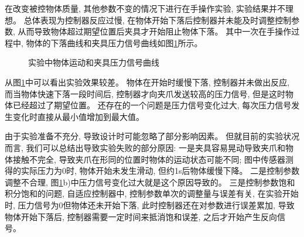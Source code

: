 在改变被控物体质量, 其他参数不变的情况下进行在手操作实验, 实验结果并不理想。
总体表现为控制器反应过慢, 在物体开始下落后控制器并未能及时调整控制参数,
从而导致物体超过期望位置后夹具才开始阻止物体下落。
其中一次在手操作过程中, 物体的下落曲线和夹具压力信号曲线如图\ref{fig:fh}所示。

\begin{figure}[!h]
  \centering
    \hspace{0pt}
  \caption{实验中物体运动和夹具压力信号曲线}
  \label{fig:fh}
  \vspace{-0.3cm}
\end{figure}

从图\ref{fig:fh}中可以看出实验效果较差。
物体在开始时缓慢下落, 控制器并未做出反应, 而当物体快速下落一段时间后, 
控制器才向夹爪发送较高的压力信号, 但是这时物体已经超过了期望位置。
还存在的一个问题是压力信号变化过大, 每次压力信号发生变化时直接从最小值增加到最大值。

由于实验准备不充分, 导致设计时可能忽略了部分影响因素。
但就目前的实验状况而言, 我们可以总结出导致实验失败的部分原因:
一是夹具容易晃动导致夹爪和物体接触不完全, 
导致夹爪在形同的位置时物体的运动状态可能不同; 
图中传感器测得的实际压力为0时, 物体开始未发生滑动, 但约1s后物体缓慢下降。
二是控制参数调整不合理, 图\ref{fig:fh}b)中压力信号变化过大就是这个原因导致的。
三是控制参数饱和积分饱和的问题, 自适应控制器中, 控制参数单次的调整量与误差有关, 
在实验开始时, 压力信号为0但物体还未开始下落, 此时控制器还在对参数进行误差累加,
导致物体开始下落后, 控制器需要一定时间来抵消饱和误差, 之后才开始产生反向信号。


